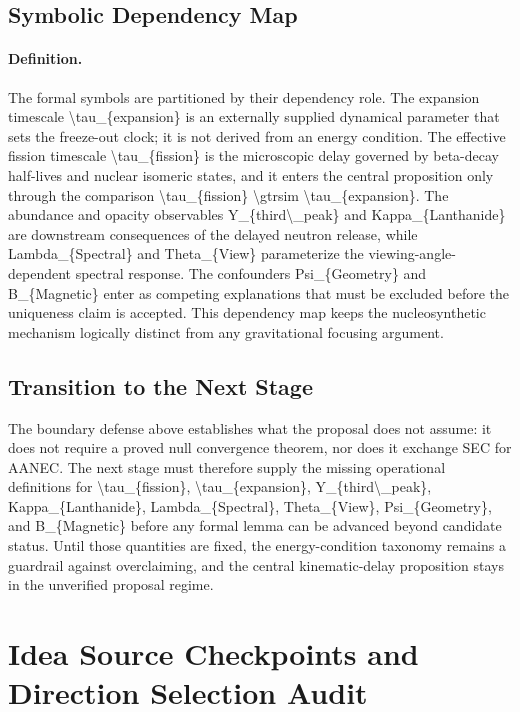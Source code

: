 \documentclass[conference]{IEEEtran}
\begin{document}
\subsection{Symbolic Dependency Map}
\paragraph{Definition.} The formal symbols are partitioned by their dependency role. The expansion timescale \textbackslash{}tau\_\{expansion\} is an externally supplied dynamical parameter that sets the freeze-out clock; it is not derived from an energy condition. The effective fission timescale \textbackslash{}tau\_\{fission\} is the microscopic delay governed by beta-decay half-lives and nuclear isomeric states, and it enters the central proposition only through the comparison \textbackslash{}tau\_\{fission\} \textbackslash{}gtrsim \textbackslash{}tau\_\{expansion\}. The abundance and opacity observables Y\_\{third\textbackslash{}\_peak\} and Kappa\_\{Lanthanide\} are downstream consequences of the delayed neutron release, while Lambda\_\{Spectral\} and Theta\_\{View\} parameterize the viewing-angle-dependent spectral response. The confounders Psi\_\{Geometry\} and B\_\{Magnetic\} enter as competing explanations that must be excluded before the uniqueness claim is accepted. This dependency map keeps the nucleosynthetic mechanism logically distinct from any gravitational focusing argument.

\subsection{Transition to the Next Stage}
The boundary defense above establishes what the proposal does not assume: it does not require a proved null convergence theorem, nor does it exchange SEC for AANEC. The next stage must therefore supply the missing operational definitions for \textbackslash{}tau\_\{fission\}, \textbackslash{}tau\_\{expansion\}, Y\_\{third\textbackslash{}\_peak\}, Kappa\_\{Lanthanide\}, Lambda\_\{Spectral\}, Theta\_\{View\}, Psi\_\{Geometry\}, and B\_\{Magnetic\} before any formal lemma can be advanced beyond candidate status. Until those quantities are fixed, the energy-condition taxonomy remains a guardrail against overclaiming, and the central kinematic-delay proposition stays in the unverified proposal regime.

\section{Idea Source Checkpoints and Direction Selection Audit}
\end{document}
